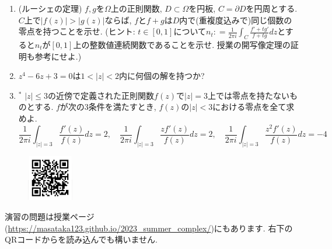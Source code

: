 \documentclass[dvipdfmx,a4paper,11pt]{article}
\theoremstyle{definition}
\begin{document}
\begin{enumerate}[label=\textbf{問}6.\arabic*]
   \item (ルーシェの定理)
   $f,g$を$\Omega$上の正則関数, $D \subset \Omega$を円板, $C = \partial D$を円周とする.
   $C$上で$|f(z)| > |g(z)|$ならば, $f$と$f+g$は$D$内で(重複度込みで)同じ個数の零点を持つことを示せ.
   (ヒント: $t \in [0,1]$について$n_{t} : = \frac{1}{2 \pi i} \int_{C} \frac{f' + t g'}{f +t g} dz$とすると$n_t$が$[0,1]$上の整数値連続関数であることを示せ. 授業の開写像定理の証明も参考にせよ.)
   
   
   \item $z^4 - 6z + 3=0$は$1 < |z| < 2$内に何個の解を持つか?
 
   
   \item $^{*}$ $|z| \le 3$の近傍で定義された正則関数$f(z)$で$|z|=3$上では零点を持たないものとする. 
   $f$が次の3条件を満たすとき, $f(z)$の$|z |<3$における零点を全て求めよ.
   $$
\frac{1}{2 \pi i} \int_{|z|=3} \frac{f'(z)}{f(z)} dz =2, \quad
\frac{1}{2 \pi i} \int_{|z|=3} \frac{zf'(z)}{f(z)} dz =2, \quad
\frac{1}{2 \pi i} \int_{|z|=3} \frac{z^2f'(z)}{f(z)} dz =-4 
   $$

 
     \end{enumerate}  
 
 \vspace{11pt}\begin{figure}  \centering\includegraphics[height=20mm, width=20mm]{complex.png}\end{figure}

演習の問題は授業ページ(\url{https://masataka123.github.io/2023_summer_complex/})にもあります. 右下のQRコードからを読み込んでも構いません.


  
  
 
\end{document}
